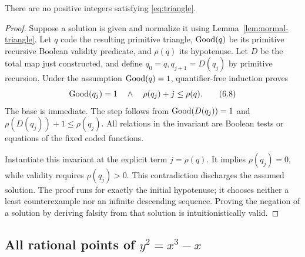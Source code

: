 \begin{theorem}\label{thm:no-square-area}
There are no positive integers satisfying \eqref{eq:triangle}.
\end{theorem}
\begin{proof}
Suppose a solution is given and normalize it using
Lemma~\ref{lem:normal-triangle}. Let $q$ code the resulting primitive
triangle, $\operatorname{Good}(q)$ be its primitive recursive Boolean validity
predicate, and $\rho(q)$ its hypotenuse. Let $D$ be the total map just
constructed, and define $q_0=q,q_{j+1}=D(q_j)$ by primitive recursion.
Under the assumption $\operatorname{Good}(q)=1$, quantifier-free induction proves
\[
           \operatorname{Good}(q_j)=1\quad\wedge\quad \rho(q_j)+j\le\rho(q).
 \tag{6.8}\label{eq:fermat-invariant}
\]
The base is immediate. The step follows from
$\operatorname{Good}(D(q_j))=1$ and $\rho(D(q_j))+1\le\rho(q_j)$.
All relations in the invariant are Boolean tests or equations of the
fixed coded functions.

Instantiate this invariant at the explicit term $j=\rho(q)$.
It implies $\rho(q_j)=0$, while validity requires $\rho(q_j)>0$.
This contradiction discharges the assumed solution.
The proof runs for exactly the initial hypotenuse; it chooses neither a
least counterexample nor an infinite descending sequence.
Proving the negation of a solution by deriving falsity from that solution
is intuitionistically valid.
\end{proof}

\subsection{All rational points of \texorpdfstring{$y^2=x^3-x$}{y2=x3-x}}

